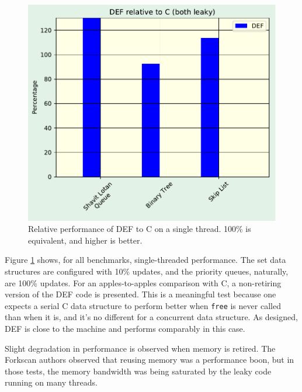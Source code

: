 \begin{figure}[htbp!]
  \centering
  \includegraphics[scale=0.4]{gfx/RelativePerf.pdf}
  \caption{Relative performance of DEF to C on a single thread.  100\% is equivalent, and higher is better.}
  \label{fig:relativeperf}
\end{figure}

Figure \ref{fig:relativeperf} shows, for all benchmarks, single-threaded performance.  The set data structures are configured with 10\% updates, and the priority queues, naturally, are 100\% updates.  For an apples-to-apples comparison with C, a non-retiring version of the DEF code is presented.  This is a meaningful test because one expects a serial C data structure to perform better when \texttt{free} is never called than when it is, and it's no different for a concurrent data structure.  As designed, DEF is close to the machine and performs comparably in this case.

Slight degradation in performance is observed when memory is retired.  The Forkscan authors observed that reusing memory was a performance boon, but in those tests, the memory bandwidth was being saturated by the leaky code running on many threads.

